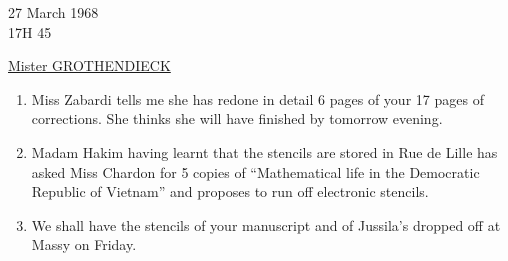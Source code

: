 \begin{flushright}
27 March 1968\\
17H 45\\
\end{flushright}

\begin{center}
\uline{Mister GROTHENDIECK}\\
\end{center}

\begin{enumerate}[label=\arabic*.]
\item Miss Zabardi tells me she has redone in detail 6 pages of your 17 pages of corrections. She thinks she will have finished by tomorrow evening.

\item Madam Hakim having learnt that the stencils are stored in Rue de Lille has asked Miss Chardon for 5 copies of ``Mathematical life in the Democratic Republic of Vietnam'' and proposes to run off electronic stencils.

\item We shall have the stencils of your manuscript and of Jussila's dropped off at Massy on Friday.
\end{enumerate}

